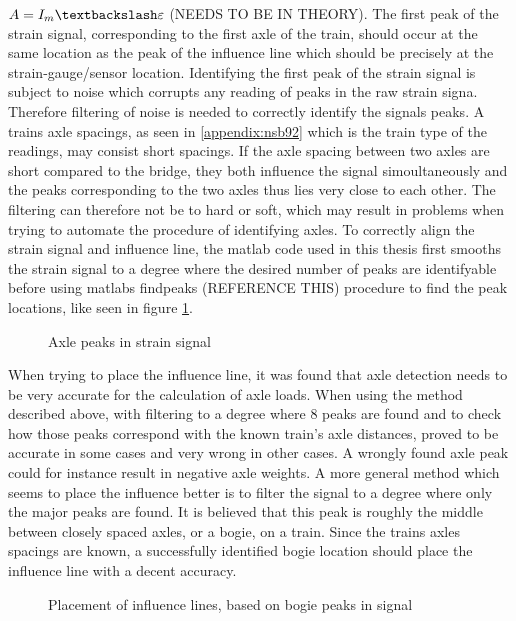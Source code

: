 $A = I_m \textbackslash \varepsilon$
(NEEDS TO BE IN THEORY).
The first peak of the strain signal, corresponding to the first axle of the train, should occur at the same location as the peak of the influence line which should be precisely at the strain-gauge/sensor location.
Identifying the first peak of the strain signal is subject to noise which corrupts any reading of peaks in the raw strain signa. Therefore filtering of noise is needed to correctly identify the signals peaks. A trains axle spacings, as seen in \ref{appendix:nsb92} which is the train type of the readings, may consist short spacings. If the axle spacing between two axles are short compared to the bridge, they both influence the signal simoultaneously and the peaks corresponding to the two axles thus lies very close to each other. The filtering can therefore not be to hard or soft, which may result in problems when trying to automate the procedure of identifying axles.
To correctly align the strain signal and influence line, the matlab code used in this thesis first smooths the strain signal to a degree where the desired number of peaks are identifyable before using matlabs findpeaks (REFERENCE THIS) procedure to find the peak locations, like seen in figure \ref{fig:axle_peaks}.
\begin{figure}[htbp]
	\begin{adjustbox}{center}
		
	\end{adjustbox}
	\caption{Axle peaks in strain signal}
	\label{fig:axle_peaks}
\end{figure}


When trying to place the influence line, it was found that axle detection needs to be very accurate for the calculation of axle loads. When using the method described above, with filtering to a degree where 8 peaks are found and to check how those peaks correspond with the known train's axle distances, proved to be accurate in some cases and very wrong in other cases. A wrongly found axle peak could for instance result in negative axle weights. A more general method which seems to place the influence better is to filter the signal to a degree where only the major peaks are found. It is believed that this peak is roughly the middle between closely spaced axles, or a bogie, on a train. Since the trains axles spacings are known, a successfully identified bogie location should place the influence line with a decent accuracy.
\begin{figure}[htbp]
	\centering
	
	\caption{Placement of influence lines, based on bogie peaks in signal}
	\label{fig:placing_influencelines}
\end{figure}


